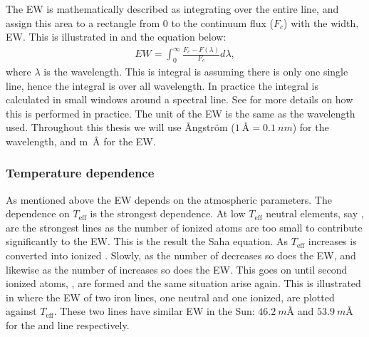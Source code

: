 The EW is mathematically described as integrating over the entire line, and assign this area to a
rectangle from 0 to the continuum flux ($F_c$) with the width, EW. This is illustrated in
 and the equation below: \begin{align} EW = \int_{0}^{\infty}
\frac{F_c-F(\lambda)}{F_c} d\lambda, \end{align} where $\lambda$ is the wavelength. This is integral
is assuming there is only one single line, hence the integral is over all wavelength. In practice
the integral is calculated in small windows around a spectral line. See  for
more details on how this is performed in practice. The unit of the EW is the same as the wavelength
used. Throughout this thesis we will use \AA{}ngstr\"{o}m ($\SI{1}{\angstrom}=\SI{0.1}{nm}$) for the
wavelength, and \si{m\angstrom} for the EW.


\subsubsection{Temperature dependence}

As mentioned above the EW depends on the atmospheric parameters. The dependence on $T_\mathrm{eff}$
is the strongest dependence. At low $T_\mathrm{eff}$ neutral elements, say , are the
strongest lines as the number of ionized atoms are too small to contribute significantly to the EW.
This is the result the Saha equation. As $T_\mathrm{eff}$ increases  is converted into
ionized . Slowly, as the number of  decreases so does the EW, and likewise as
the number of  increases so does the EW. This goes on until second ionized atoms,
, are formed and the same situation arise again. This is illustrated in
 where the EW of two iron lines, one neutral and one ionized, are plotted against
$T_\mathrm{eff}$. These two lines have similar EW in the Sun: $\SI{46.2}{m\angstrom}$ and
$\SI{53.9}{m\angstrom}$ for the  and  line respectively.


